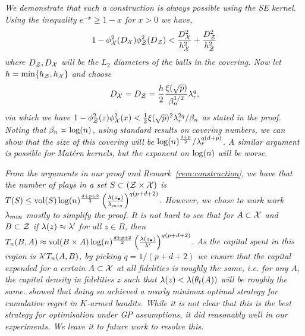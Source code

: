 \vspace{0.2in}

\begin{remark}
\label{rem:construction}
\emph{
We demonstrate that such a construction is always possible using the SE kernel.
Using the inequality $e^{-x} \geq 1 - x$ for $x>0$ we have,
\[
1 - \phi_{\mathcal{X}}^2(D_{\mathcal{X}})\phi_{\mathcal{Z}}^2(D_{\mathcal{Z}}) <
\frac{D_{\mathcal{X}}^2}{h_{\mathcal{X}}^2} + 
\frac{D_{\mathcal{Z}}^2}{h_{\mathcal{Z}}^2} 
\]
where $D_{\mathcal{Z}},D_{\mathcal{X}}$ will be the $L_2$ diameters of the balls in the covering.
Now let $h = \min\{h_{\mathcal{Z}}, h_{\mathcal{X}}\}$ and choose 
\[
D_{\mathcal{X}} = D_{\mathcal{Z}} = \frac{h}{2}\frac{\xi(\sqrt{p})}{\beta^{1/2}_n} \lambda_r^{q},
\]
via which we have
$1 - \phi_{\mathcal{Z}}^2(z) \phi_{\mathcal{X}}^2(x) < \frac{1}{2}\xi(\sqrt{p})^2\lambda_r^{2q}/\beta_n$
as stated in the proof.
Noting that $\beta_n\asymp\log(n)$, using standard results on covering numbers, we can
show that the size of this covering will be
$\log(n)^{\frac{d+p}{2}}/\lambda_r^{q(d+p)}$.
A similar argument is possible for Mat\'ern kernels, but the exponent on $\log(n)$ will be
worse.
}
\end{remark}

\begin{remark}
\label{rem:qchoice}
\emph{
From the arguments in our proof and Remark~\ref{rem:construction}, we have that
the number of plays in a set $S\subset(\mathcal{Z}\times\mathcal{X})$ is
$T(S)\leq {\bf{\rm vol}}(S) \log(n)^{\frac{d+p+2}{2}}
\left(\frac{\lambda(z_{\bullet})}{\lambda_{min}}\right)^{q(p+d+2)}$.
However, we chose to work work $\lambda_{min}$ mostly to simplify the proof.
It is not hard to see that for $A\subset\mathcal{X}$ and $B\subset\mathcal{Z}$
if $\lambda(z) \approx \lambda'$ for all $z\in B$, then
$T_n(B,A)\approx {\bf{\rm vol}}(B\times A) \log(n)^{\frac{d+p+2}{2}}
\left(\frac{\lambda(z_{\bullet})}{\lambda'}\right)^{q(p+d+2)}$.
As the capital spent in this region is $\lambda'T_n(A,B)$,
by picking $q=1/(p+d+2)$ we ensure that the 
capital expended for a certain $A\subset\mathcal{X}$ at all fidelities is roughly the same,
i.e. for any $A$, the capital density in fidelities $z$ such that $\lambda(z) <
\lambda(\theta_t(A))$ will be roughly the same.
\citet{kandasamy16mfbandit} showed that doing so achieved a nearly minimax optimal strategy
for cumulative regret in $K$-armed bandits.
While it is not clear that this is the best strategy for optimisation under GP
assumptions, it did reasonably well in our experiments. We leave it to
future work to resolve this.
}
\end{remark}


